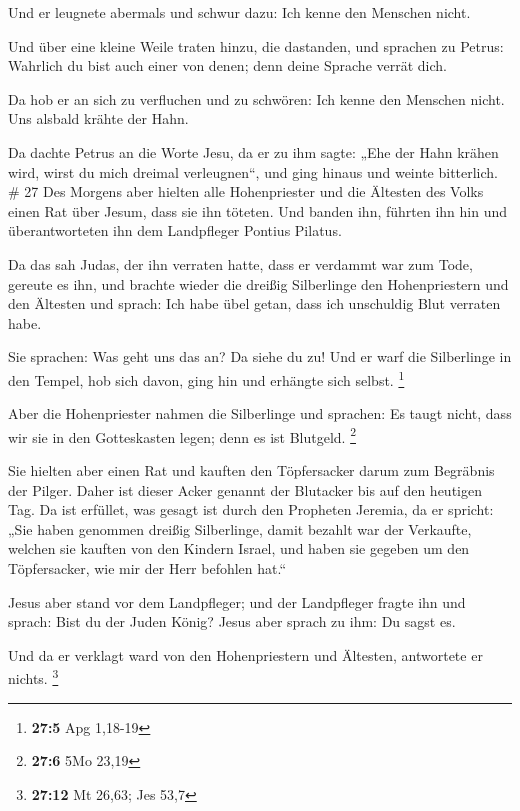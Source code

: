  Und er leugnete abermals und schwur dazu: Ich kenne den
Menschen nicht.

 Und über eine kleine Weile traten hinzu, die dastanden,
und sprachen zu Petrus: Wahrlich du bist auch einer von denen; denn
deine Sprache verrät dich.

 Da hob er an sich zu verfluchen und zu schwören: Ich
kenne den Menschen nicht. Uns alsbald krähte der Hahn.

 Da dachte Petrus an die Worte Jesu, da er zu ihm sagte:
„Ehe der Hahn krähen wird, wirst du mich dreimal verleugnen``, und ging
hinaus und weinte bitterlich. \# 27  Des Morgens aber
hielten alle Hohenpriester und die Ältesten des Volks einen Rat über
Jesum, dass sie ihn töteten.  Und banden ihn, führten ihn
hin und überantworteten ihn dem Landpfleger Pontius Pilatus.

 Da das sah Judas, der ihn verraten hatte, dass er
verdammt war zum Tode, gereute es ihn, und brachte wieder die dreißig
Silberlinge den Hohenpriestern und den Ältesten  und
sprach: Ich habe übel getan, dass ich unschuldig Blut verraten habe.

 Sie sprachen: Was geht uns das an? Da siehe du zu! Und er
warf die Silberlinge in den Tempel, hob sich davon, ging hin und
erhängte sich selbst. \footnote{\textbf{27:5} Apg 1,18-19}

 Aber die Hohenpriester nahmen die Silberlinge und
sprachen: Es taugt nicht, dass wir sie in den Gotteskasten legen; denn
es ist Blutgeld. \footnote{\textbf{27:6} 5Mo 23,19}

 Sie hielten aber einen Rat und kauften den Töpfersacker
darum zum Begräbnis der Pilger.  Daher ist dieser Acker
genannt der Blutacker bis auf den heutigen Tag.  Da ist
erfüllet, was gesagt ist durch den Propheten Jeremia, da er spricht:
„Sie haben genommen dreißig Silberlinge, damit bezahlt war der
Verkaufte, welchen sie kauften von den Kindern Israel, 
und haben sie gegeben um den Töpfersacker, wie mir der Herr befohlen
hat.``

 Jesus aber stand vor dem Landpfleger; und der
Landpfleger fragte ihn und sprach: Bist du der Juden König? Jesus aber
sprach zu ihm: Du sagst es.

 Und da er verklagt ward von den Hohenpriestern und
Ältesten, antwortete er nichts. \footnote{\textbf{27:12} Mt 26,63; Jes
  53,7}

